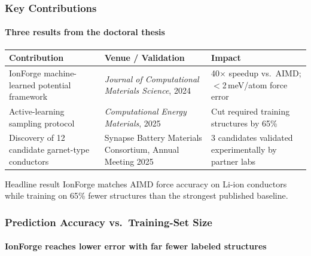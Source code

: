 \begin{frame}
\frametitle{Key Contributions}
\framesubtitle{Three results from the doctoral thesis}

\footnotesize
\begin{tabularx}{\linewidth}{@{}l X X@{}}
\toprule
Contribution & Venue / Validation & Impact \\
\midrule
IonForge machine-learned potential framework & \emph{Journal of Computational Materials Science}, 2024 & 40$\times$ speedup vs.\ AIMD; $<$2\,meV/atom force error \\
Active-learning sampling protocol & \emph{Computational Energy Materials}, 2025 & Cut required training structures by 65\% \\
Discovery of 12 candidate garnet-type conductors & Synapse Battery Materials Consortium, Annual Meeting 2025 & 3 candidates validated experimentally by partner labs \\
\bottomrule
\end{tabularx}

\vspace{0.05cm}
\begin{block}{Headline result}
\footnotesize IonForge matches AIMD force accuracy on Li-ion conductors while training on 65\% fewer structures than the strongest published baseline.
\end{block}
\end{frame}

\begin{frame}
\frametitle{Prediction Accuracy vs.\ Training-Set Size}
\framesubtitle{IonForge reaches lower error with far fewer labeled structures}

\begin{center}
\end{center}
\end{frame}

